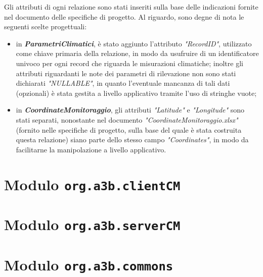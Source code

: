 Gli attributi di ogni relazione sono stati inseriti sulla base delle indicazioni fornite nel documento delle specifiche di progetto. Al riguardo, sono degne di nota le seguenti scelte progettuali:
\begin{itemize}
	\item in \textit{\textbf{ParametriClimatici}}, è stato aggiunto l'attributo \textit{"RecordID"}, utilizzato come chiave primaria della relazione, in modo da usufruire di un identificatore univoco per ogni record che riguarda le misurazioni climatiche; inoltre gli attributi riguardanti le note dei parametri di rilevazione non sono stati dichiarati \textit{"NULLABLE"}, in quanto l'eventuale mancanza di tali dati (opzionali) è stata gestita a livello applicativo tramite l'uso di stringhe vuote;
	\item in \textit{\textbf{CoordinateMonitoraggio}}, gli attributi \textit{"Latitude"} e \textit{"Longitude"} sono stati separati, nonostante nel documento \textit{"CoordinateMonitoraggio.xlsx"} (fornito nelle specifiche di progetto, sulla base del quale è stata costruita questa relazione) siano parte dello stesso campo \textit{"Coordinates"}, in modo da facilitarne la manipolazione a livello applicativo.
\end{itemize}

\chapter{Modulo \texttt{org.a3b.clientCM}}
\label{ch:client}

\chapter{Modulo \texttt{org.a3b.serverCM}}
\label{ch:server}

\chapter{Modulo \texttt{org.a3b.commons}}
\label{ch:commons}

\nocite{IuriTex}


